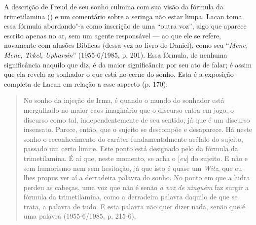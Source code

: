 A descrição de Freud de seu sonho culmina com sua visão da fórmula da
trimetilamina () e um comentário sobre a seringa não estar
limpa. Lacan toma essa fórmula abordando"-a como inscrição de uma ``outra
voz'', algo que aparece escrito apenas no ar, sem um agente responsável
--- ao que ele se refere, novamente com alusões Bíblicas (dessa vez ao
livro de Daniel), como seu ``\emph{Mene, Mene, Tekel, Upharsin}'' (1955-6/1985, p.
201). Essa fórmula, de nenhuma significância naquilo que diz, é da maior
significância por seu ato de falar; é assim que ela revela ao sonhador o
que está no cerne do sonho. Esta é a exposição completa de Lacan em
relação a esse aspecto (p. 170):

\begin{quote}
No sonho da injeção de Irma, é quando o mundo do sonhador está
mergulhado no maior caos imaginário que o discurso entra em jogo, o
discurso como tal, independentemente de seu sentido, já que é um
discurso insensato. Parece, então, que o sujeito se descompõe e
desaparece. Há neste sonho o reconhecimento do caráter fundamentalmente
acéfalo do sujeito, passado um certo limite. Este ponto está designado
pelo \emph{} da fórmula da trimetilamina. É aí que, neste momento, se
acha o {[}\emph{eu}{]} do sujeito. E não e sem humorismo nem sem
hesitação, já que isto é quase um \emph{Witz}, que eu lhes propus ver aí
a derradeira palavra do sonho. No ponto em que a hidra perdeu as
cabeças, uma voz que não é senão \emph{a voz de} \emph{ninguém} faz
surgir a fórmula da trimetilamina, como a derradeira palavra daquilo de
que se trata, a palavra de tudo. E esta palavra não quer dizer nada,
senão que é uma palavra (1955-6/1985, p. 215-6).
\end{quote}

